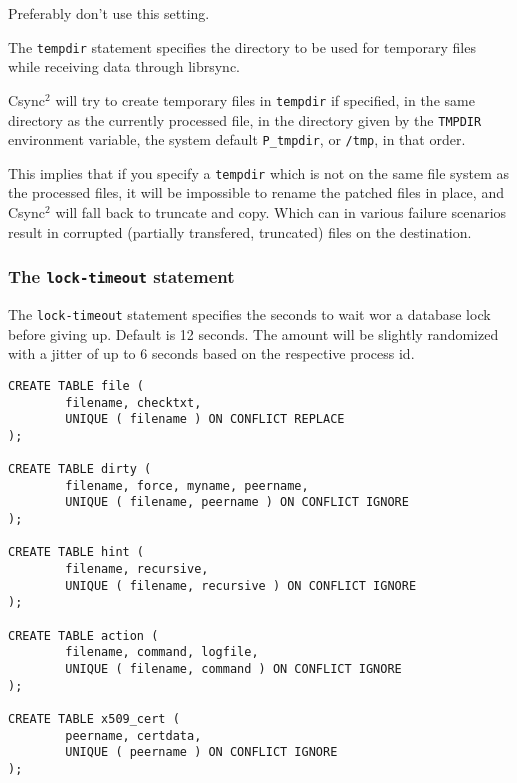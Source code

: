\documentclass[a4paper,twocolumn]{article}
\def\csync2{{\sc Csync$^{2}$}}
\begin{document}
Preferably don't use this setting.

The {\tt tempdir} statement specifies the directory to be used for temporary
files while receiving data through librsync.

\csync2 will try to create temporary files in {\tt tempdir} if specified,
in the same directory as the currently processed file,
in the directory given by the {\tt TMPDIR} environment variable,
the system default {\tt P\_tmpdir}, or {\tt /tmp}, in that order.

This implies that if you specify a {\tt tempdir} which is not on the
same file system as the processed files, it will be impossible to
rename the patched files in place, and \csync2 will fall back to truncate
and copy. Which can in various failure scenarios result in corrupted (partially
transfered, truncated) files on the destination.

\subsubsection{The {\tt lock-timeout} statement}

The {\tt lock-timeout} statement specifies the seconds to wait wor a database lock
before giving up. Default is 12 seconds. The amount will be slightly randomized
with a jitter of up to 6 seconds based on the respective process id.


\begin{figure*}[t]
  \begin{center}
\begin{verbatim}
CREATE TABLE file (
        filename, checktxt,
        UNIQUE ( filename ) ON CONFLICT REPLACE
);

CREATE TABLE dirty (
        filename, force, myname, peername,
        UNIQUE ( filename, peername ) ON CONFLICT IGNORE
);

CREATE TABLE hint (
        filename, recursive,
        UNIQUE ( filename, recursive ) ON CONFLICT IGNORE
);

CREATE TABLE action (
        filename, command, logfile,
        UNIQUE ( filename, command ) ON CONFLICT IGNORE
);

CREATE TABLE x509_cert (
        peername, certdata,
        UNIQUE ( peername ) ON CONFLICT IGNORE
);
\end{verbatim}
  \end{center}
  \caption{The \csync2 database schema}
\end{figure*}
\end{document}
